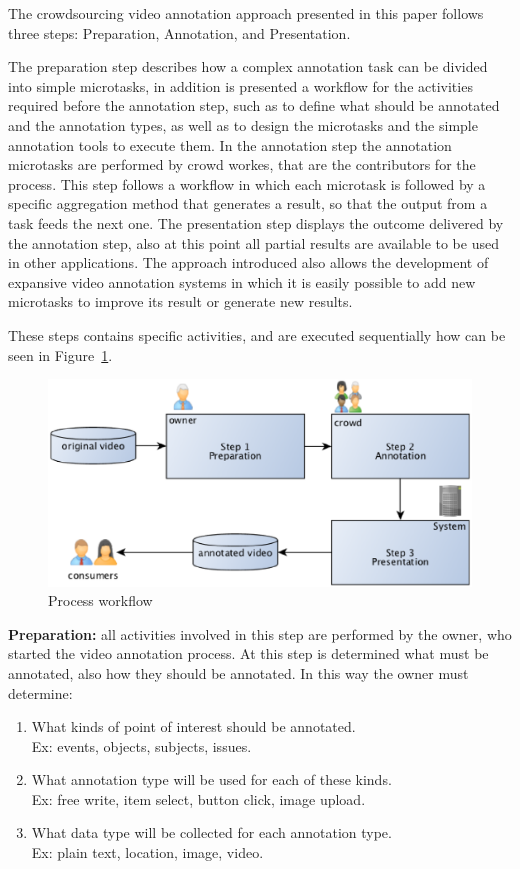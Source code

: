 The crowdsourcing video annotation approach presented in this paper follows three steps: Preparation, Annotation, and Presentation. 

The preparation step describes how a complex annotation task can be divided into simple microtasks, in addition is presented a workflow for the activities required before the annotation step, such as to define what should be annotated and the annotation types, as well as to design the microtasks and the simple annotation tools to execute them. In the annotation step the annotation microtasks are performed by crowd workes, that are the contributors for the process. This step follows a workflow in which each microtask is followed by a specific aggregation method that generates a result, so that the output from a task feeds the next one. The presentation step displays the outcome delivered by the annotation step, also at this point all partial results are available to be used in other applications. The approach introduced also allows the development of expansive video annotation systems in which it is easily possible to add new microtasks to improve its result or generate new results. 

These steps contains specific activities, and are executed sequentially how can be seen in Figure~\ref{process}.

\begin{figure}[h]
	\centerline{\includegraphics[scale=0.4] {figure/process}}
	\caption{Process workflow}
	\label{process}
\end{figure}

\textbf{Preparation:} all activities involved in this step are performed by the owner, who started the video annotation process. At this step is determined what must be annotated, also how they should be annotated. In this way the owner must determine:
\begin{enumerate}
\item What kinds of point of interest should be annotated.\\Ex: events, objects, subjects, issues.
\item What annotation type will be used for each of these kinds.\\Ex: free write, item select, button click, image upload.
\item What data type will be collected for each annotation type.\\Ex: plain text, location, image, video.
\end{enumerate}


